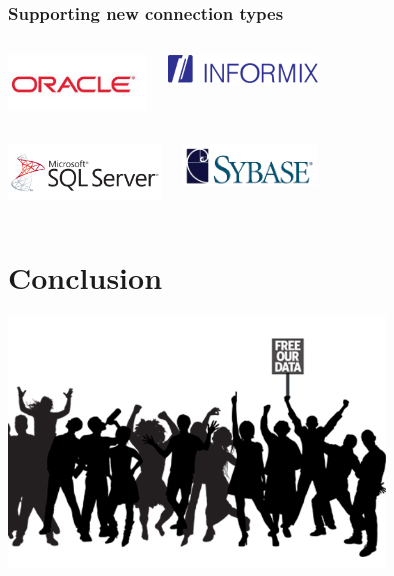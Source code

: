 \documentclass{beamer}
\begin{document}
\begin{frame}
  \frametitle{Supporting new connection types}

  \begin{columns}[c]
    \begin{center}
      \includegraphics[height=4em]{oracle-logo.png}
    \end{center}
    \begin{center}
      \includegraphics[height=2em]{Informix_d1323_450x450.png}
    \end{center}
  \end{columns}
  \vfill

  \begin{columns}[c]
    \begin{center}
      \includegraphics[height=4em]{mssql.png}
    \end{center}
    \begin{center}
      \includegraphics[height=3em]{sybase_logo.png}
    \end{center}
  \end{columns}
\end{frame}

\section{Conclusion}

\begin{frame}[fragile]
  \begin{center}
    \includegraphics[height=18em]{free-our-open-data.jpg}
  \end{center}
\end{frame}
\end{document}
